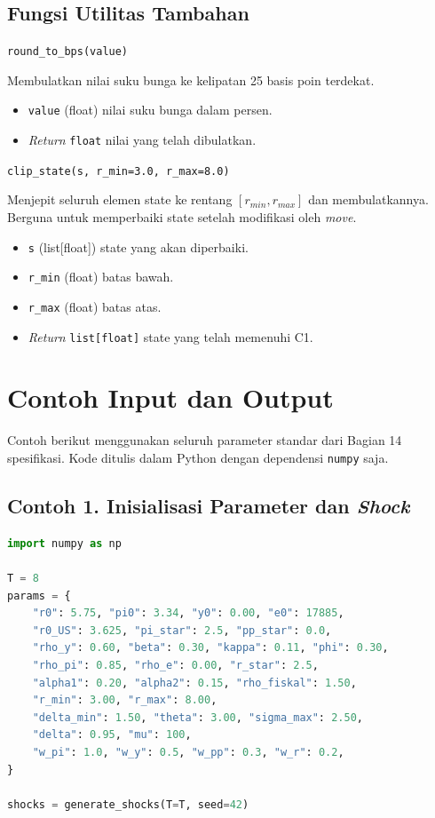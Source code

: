 \subsection*{Fungsi Utilitas Tambahan}

\texttt{round\_to\_bps(value)}

Membulatkan nilai suku bunga ke kelipatan 25 basis poin terdekat.

\begin{itemize}
    \item \texttt{value} (float) nilai suku bunga dalam persen.
    \item \textit{Return} \texttt{float} nilai yang telah dibulatkan.
\end{itemize}

\texttt{clip\_state(s, r\_min=3.0, r\_max=8.0)}

Menjepit seluruh elemen state ke rentang $[r_{min}, r_{max}]$ dan membulatkannya. Berguna untuk memperbaiki state setelah modifikasi oleh \textit{move}.

\begin{itemize}
    \item \texttt{s} (list[float]) state yang akan diperbaiki.
    \item \texttt{r\_min} (float) batas bawah.
    \item \texttt{r\_max} (float) batas atas.
    \item \textit{Return} \texttt{list[float]} state yang telah memenuhi C1.
\end{itemize}

\section{Contoh Input dan Output}

Contoh berikut menggunakan seluruh parameter standar dari Bagian 14 spesifikasi. Kode ditulis dalam Python dengan dependensi \texttt{numpy} saja.

\subsection*{Contoh 1. Inisialisasi Parameter dan \textit{Shock}}

\begin{tcolorbox}[title=Input]
    \begin{lstlisting}[language=Python]
import numpy as np

T = 8
params = {
    "r0": 5.75, "pi0": 3.34, "y0": 0.00, "e0": 17885,
    "r0_US": 3.625, "pi_star": 2.5, "pp_star": 0.0,
    "rho_y": 0.60, "beta": 0.30, "kappa": 0.11, "phi": 0.30,
    "rho_pi": 0.85, "rho_e": 0.00, "r_star": 2.5,
    "alpha1": 0.20, "alpha2": 0.15, "rho_fiskal": 1.50,
    "r_min": 3.00, "r_max": 8.00,
    "delta_min": 1.50, "theta": 3.00, "sigma_max": 2.50,
    "delta": 0.95, "mu": 100,
    "w_pi": 1.0, "w_y": 0.5, "w_pp": 0.3, "w_r": 0.2,
}

shocks = generate_shocks(T=T, seed=42)
\end{lstlisting}
\end{tcolorbox}

